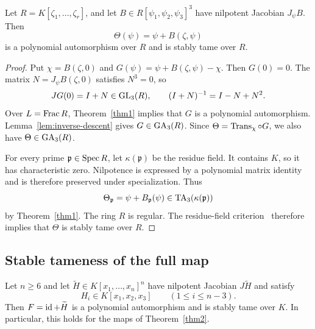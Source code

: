\begin{proposition}\label{prop:ring-nilpotent}
Let $R=K[\zeta_1,\ldots,\zeta_r]$, and let $B\in R[\psi_1,\psi_2,\psi_3]^3$ have nilpotent Jacobian $J_\psi B$. Then
\[
 \Theta(\psi)=\psi+B(\zeta,\psi)
\]
is a polynomial automorphism over $R$ and is stably tame over $R$.
\end{proposition}

\begin{proof}
Put $\chi=B(\zeta,0)$ and $G(\psi)=\psi+B(\zeta,\psi)-\chi$. Then $G(0)=0$. The matrix $N=J_\psi B(\zeta,0)$ satisfies $N^3=0$, so
\[
 JG(0)=I+N\in\operatorname{GL}_3(R),\qquad (I+N)^{-1}=I-N+N^2.
\]
Over $L=\operatorname{Frac} R$, Theorem~\ref{thm1} implies that $G$ is a polynomial automorphism. Lemma~\ref{lem:inverse-descent} gives $G\in\operatorname{GA}_3(R)$. Since $\Theta=\operatorname{Trans}_{\chi}\circ G$, we also have $\Theta\in\operatorname{GA}_3(R)$.

For every prime $\mathfrak p\in\operatorname{Spec} R$, let $\kappa(\mathfrak p)$ be the residue field. It contains $K$, so it has characteristic zero. Nilpotence is expressed by a polynomial matrix identity and is therefore preserved under specialization. Thus
\[
 \Theta_{\mathfrak p}=\psi+B_{\mathfrak p}(\psi)
 \in\operatorname{TA}_3(\kappa(\mathfrak p))
\]
by Theorem~\ref{thm1}. The ring $R$ is regular. The residue-field criterion~\cite[Theorem~4.12]{BEW} therefore implies that $\Theta$ is stably tame over $R$.
\end{proof}

\subsection{Stable tameness of the full map}
\begin{theorem}\label{thm3}
Let $n\geq6$ and let $\widetilde H\in K[x_1,\ldots,x_n]^n$ have nilpotent Jacobian $J\widetilde H$ and satisfy
\[
 H_i\in K[x_1,x_2,x_3]\qquad(1\leq i\leq n-3).
\]
Then $F=\operatorname{id}+\widetilde H$ is a polynomial automorphism and is stably tame over $K$. In particular, this holds for the maps of Theorem~\ref{thm2}.
\end{theorem}

